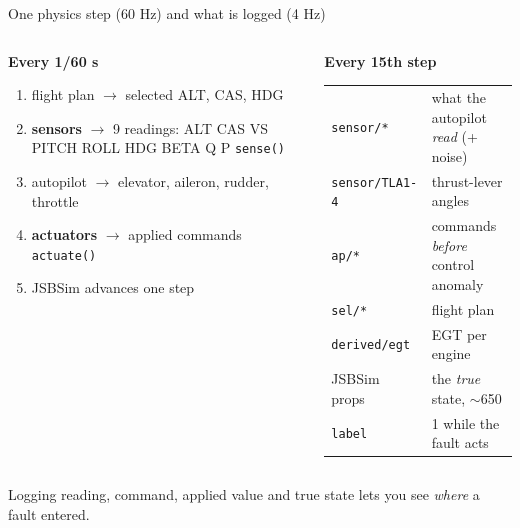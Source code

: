 \documentclass[aspectratio=169,11pt]{beamer}
\newcommand{\obs}[1]{{\color{flight}\textbf{#1}}}
\newcommand{\ctl}[1]{{\color{twin}\textbf{#1}}}
\newcommand{\aside}[1]{{\color{muted}\small #1}}
\begin{document}
\begin{frame}{One physics step (60 Hz) and what is logged (4 Hz)}
  \begin{columns}[T]
    \begin{column}{0.47\textwidth}
      \textbf{Every 1/60 s}
      \begin{enumerate}\small
        \item flight plan $\rightarrow$ selected ALT, CAS, HDG
        \item \obs{sensors} $\rightarrow$ 9 readings: ALT CAS VS PITCH ROLL HDG BETA Q P \hfill\texttt{sense()}
        \item autopilot $\rightarrow$ elevator, aileron, rudder, throttle
        \item \ctl{actuators} $\rightarrow$ applied commands \hfill\texttt{actuate()}
        \item JSBSim advances one step
      \end{enumerate}
    \end{column}
    \begin{column}{0.49\textwidth}
      \textbf{Every 15th step}
      \small
      \begin{tabularx}{\linewidth}{@{}l L@{}}
        \toprule
        \texttt{sensor/*} & what the autopilot \emph{read} (+ noise) \\
        \texttt{sensor/TLA1-4} & thrust-lever angles \\
        \texttt{ap/*} & commands \emph{before} control anomaly \\
        \texttt{sel/*} & flight plan \\
        \texttt{derived/egt} & EGT per engine \\
        JSBSim props & the \emph{true} state, $\sim$650 \\
        \texttt{label} & 1 while the fault acts \\
        \bottomrule
      \end{tabularx}
    \end{column}
  \end{columns}
  \vspace{0.8em}
  \aside{Logging reading, command, applied value and true state lets you see \emph{where} a fault entered.}
\end{frame}
\end{document}
